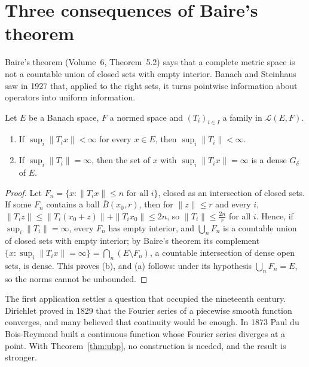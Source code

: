 \section{Three consequences of Baire's theorem}

Baire's theorem (Volume~6, Theorem~5.2) says that a complete metric space is not a countable union of closed sets with empty interior. Banach and Steinhaus saw in 1927 that, applied to the right sets, it turns pointwise
information about operators into uniform information.

\begin{theorem}\label{thm:ubp}
Let $E$ be a Banach space, $F$ a normed space and $(T_i)_{i\in I}$ a family in $\mathcal L(E,F)$.
\begin{enumerate}
\item[(a)] If $\sup_i\|T_ix\|<\infty$ for every $x\in E$, then $\sup_i\|T_i\|<\infty$.
\item[(b)] If $\sup_i\|T_i\|=\infty$, then the set of $x$ with $\sup_i\|T_ix\|=\infty$ is a dense $G_\delta$ of $E$.
\end{enumerate}
\end{theorem}
\begin{proof}
Let $F_n=\{x:\|T_ix\|\le n\text{ for all }i\}$, closed as an intersection of closed sets. If some $F_n$ contains a ball $\overline B(x_0,r)$, then for $\|z\|\le r$ and every $i$,
$\|T_iz\|\le\|T_i(x_0+z)\|+\|T_ix_0\|\le2n$, so $\|T_i\|\le\frac{2n}r$ for all $i$. Hence, if $\sup_i\|T_i\|=\infty$, every $F_n$ has empty interior, and $\bigcup_nF_n$ is a countable union of closed sets with empty
interior; by Baire's theorem its complement $\{x:\sup_i\|T_ix\|=\infty\}=\bigcap_n(E\setminus F_n)$, a countable intersection of dense open sets, is dense. This proves (b), and (a) follows: under its hypothesis
$\bigcup_nF_n=E$, so the norms cannot be unbounded.
\end{proof}

The first application settles a question that occupied the nineteenth century. Dirichlet proved in 1829 that the Fourier series of a piecewise smooth function converges, and many believed that continuity would be
enough. In 1873 Paul du Bois-Reymond built a continuous function whose Fourier series diverges at a point. With Theorem~\ref{thm:ubp}, no construction is needed, and the result is stronger.

